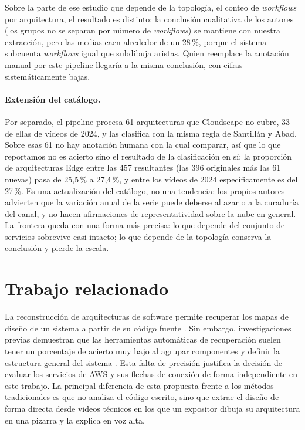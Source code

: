 \documentclass[a4paper, twocolumn, 10pt]{IEEEtran}
\begin{document}
Sobre la parte de ese estudio que depende de la topología, el conteo de \emph{workflows} por arquitectura, el resultado es distinto: la conclusión cualitativa de los autores (los grupos no se separan por número de \emph{workflows}) se mantiene con nuestra extracción, pero las medias caen alrededor de un 28\,\%, porque el sistema subcuenta \emph{workflows} igual que subdibuja aristas. Quien reemplace la anotación manual por este pipeline llegaría a la misma conclusión, con cifras sistemáticamente bajas.

\paragraph{Extensión del catálogo.} Por separado, el pipeline procesa 61 arquitecturas que Cloudscape no cubre, 33 de ellas de vídeos de 2024, y las clasifica con la misma regla de Santillán y Abad. Sobre esas 61 no hay anotación humana con la cual comparar, así que lo que reportamos no es acierto sino el resultado de la clasificación en sí: la proporción de arquitecturas Edge entre las 457 resultantes (las 396 originales más las 61 nuevas) pasa de 25,5\,\% a 27,4\,\%, y entre los vídeos de 2024 específicamente es del 27\,\%. Es una actualización del catálogo, no una tendencia: los propios autores advierten que la variación anual de la serie puede deberse al azar o a la curaduría del canal, y no hacen afirmaciones de representatividad sobre la nube en general. La frontera queda con una forma más precisa: lo que depende del conjunto de servicios sobrevive casi intacto; lo que depende de la topología conserva la conclusión y pierde la escala.

 
\section{Trabajo relacionado}
La reconstrucción de arquitecturas de software permite recuperar los mapas de diseño de un sistema a partir de su código fuente \cite{Ducasse2009SAR}. Sin embargo, investigaciones previas demuestran que las herramientas automáticas de recuperación suelen tener un porcentaje de acierto muy bajo al agrupar componentes y definir la estructura general del sistema \cite{Garcia2013ComparativeSAR}. Esta falta de precisión justifica la decisión de evaluar los servicios de AWS y sus flechas de conexión de forma independiente en este trabajo. La principal diferencia de esta propuesta frente a los métodos tradicionales es que no analiza el código escrito, sino que extrae el diseño de forma directa desde videos técnicos en los que un expositor dibuja su arquitectura en una pizarra y la explica en voz alta.
 
\end{document}
